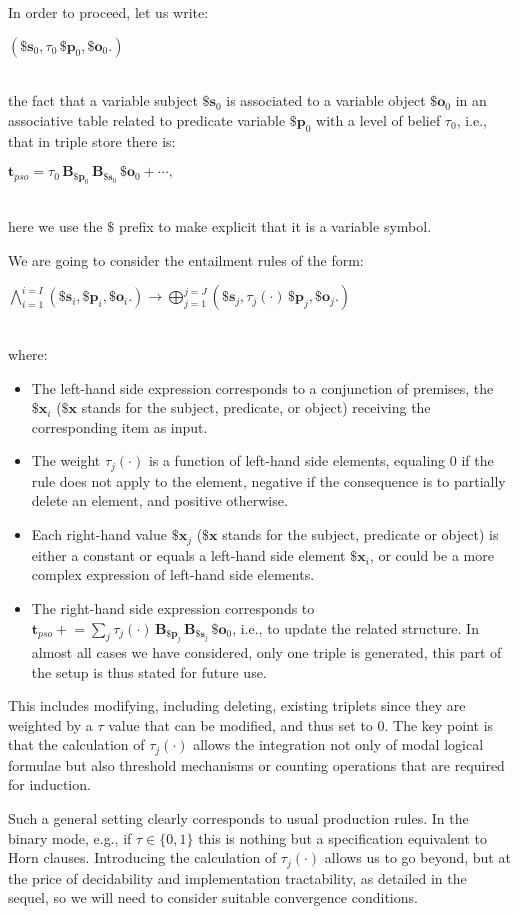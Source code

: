 \documentclass[sn-mathphys]{sn-jnl}
\newcommand{\eqline}[1]{~\vspace{0.1cm}\\\centerline{$#1$}\vspace{0.1cm}\\}
\begin{document}
In order to proceed, let us write:
\eqline{(\mathbf{\$s}_0,  \tau_0 \, \mathbf{\$p}_0,  \mathbf{\$o}_0 .)}
the fact that a variable subject $\mathbf{\$s}_0$ is associated to a variable object $\mathbf{\$o}_0$ in an associative table related to predicate variable $\mathbf{\$p}_0$ with a level of belief $\tau_0$, i.e., that in triple store there is:
\eqline{\mathbf{t}_{pso} = \tau_0 \, \mathbf{B}_{\mathbf{\$p}_0} \, \mathbf{B}_{\mathbf{\$s}_0} \, \mathbf{\$o}_0 + \cdots,}
here we use the $\$$ prefix to make explicit that it is a variable symbol.

We are going to consider the entailment rules of the form:
\eqline{\bigwedge_{i=1}^{i=I} (\mathbf{\$s}_i,  \mathbf{\$p}_i,  \mathbf{\$o}_i .) \rightarrow \bigoplus_{j=1}^{j=J} (\mathbf{\$s}_j,  \tau_j(\cdot) \, \mathbf{\$p}_j,  \mathbf{\$o}_j .)}
where:
\begin{itemize}
\item The left-hand side expression corresponds to a conjunction of premises, the $\mathbf{\$x}_i$ ($\mathbf{\$x}$ stands for the subject, predicate, or object) receiving the corresponding item as input.
\item The weight $\tau_j(\cdot)$ is a function of left-hand side elements, equaling $0$ if the rule does not apply to the element, negative if the consequence is to partially delete an element, and positive otherwise.
\item Each right-hand value $\mathbf{\$x}_j$ ($\mathbf{\$x}$ stands for the subject, predicate or object) is either a constant or equals a left-hand side element $\mathbf{\$x}_i$, or could be a more complex expression of left-hand side elements.
\item The right-hand side expression corresponds to $\mathbf{t}_{pso} \mathrel{+}= \sum_j \tau_j(\cdot) \, \mathbf{B}_{\mathbf{\$p}_j} \, \mathbf{B}_{\mathbf{\$s}_j} \, \mathbf{\$o}_0$, i.e., to update the related structure. In almost all cases we have considered, only one triple is generated, this part of the setup is thus stated for future use.
\end{itemize}

This includes modifying, including deleting, existing triplets since they are weighted by a $\tau$ value that can be modified, and thus set to $0$. The key point is that the calculation of $\tau_j(\cdot)$ allows the integration not only of modal logical formulae but also threshold mechanisms or counting operations that are required for induction.

Such a general setting clearly corresponds to usual production rules. In the binary mode, e.g., if $\tau \in \{0, 1\}$ this is nothing but a specification equivalent to Horn clauses. Introducing the calculation of $\tau_j(\cdot)$ allows us to go beyond, but at the price of decidability and implementation tractability, as detailed in the sequel, so we will need to consider suitable convergence conditions.
\end{document}
